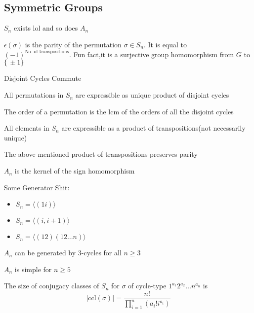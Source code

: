 \documentclass[11pt]{scrartcl}
\newcommand\setp[1]{\{\,#1\}}
\begin{document}
\subsection{Symmetric Groups}
\begin{definitions}
$S_{n}$ exists lol and so does $A_{n}$
\end{definitions}
\begin{definitions}
$\epsilon(\sigma)$ is the parity of the permutation $\sigma \in S_{n}$. It is equal to $(-1)^{\text{No. of transpositions}}$. Fun fact,it is a surjective group homomorphism from $G$ to $\setp{\pm 1}$
\end{definitions}
\begin{prop}
Disjoint Cycles Commute
\end{prop}
\begin{prop}
All permutations in $S_n$ are expressible as unique product of disjoint cycles
\end{prop}
\begin{prop}
The order of a permutation is the lcm of the orders of all the disjoint cycles
\end{prop}
\begin{prop}
All elements in $S_{n}$ are expressible as a product of transpositions(not necessarily unique)
\end{prop}
\begin{prop}
The above mentioned product of transpositions preserves parity
\end{prop}
\begin{prop}
$A_{n}$ is the kernel of the sign homomorphism
\end{prop}
\begin{prop}
Some Generator Shit:
\begin{itemize}
    \item $S_n = \langle (1i) \rangle$
    \item $S_n = \langle (i,i+1)\rangle$
    \item $S_n = \langle (1 2) (1 2 \ldots n) \rangle$
\end{itemize}
\end{prop}
\begin{prop}
$A_n$ can be generated by 3-cycles for all $n\geq 3$
\end{prop}
\begin{prop}
$A_n$ is simple for $n \geq 5$
\end{prop}
\begin{prop}
The size of conjugacy classes of $S_n$ for $\sigma$ of cycle-type $1^{a_1}2^{a_2}\ldots n^{a_n}$ is 
$$\vert \text{ccl}(\sigma) \vert = \frac{n!}{\prod_{i=1}^{n}(a_{i}! i^{a_i})}$$
\end{prop}
\end{document}
